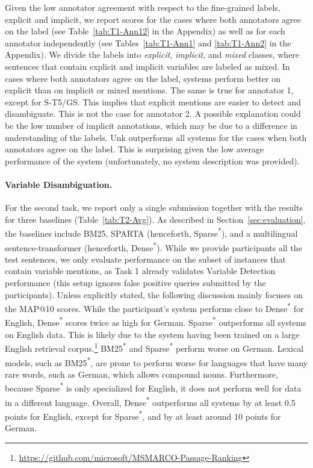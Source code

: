 \documentclass[11pt]{article}
\begin{document}
Given the low annotator agreement with respect to the fine-grained labels, explicit and implicit, we report scores for the cases where both annotators agree on the label (see Table~\ref{tab:T1-Ann12} in the Appendix) as well as for each annotator independently (see Tables~\ref{tab:T1-Ann1} and \ref{tab:T1-Ann2} in the Appendix).
We divide the labels into \textit{explicit}, \textit{implicit}, and \textit{mixed} classes, where sentences that contain explicit and implicit variables are labeled as mixed.
In cases where both annotators agree on the label, systems perform better on explicit than on implicit or mixed mentions.
The same is true for annotator 1, except for S-T5/GS.
This implies that explicit mentions are easier to detect and disambiguate.
This is not the case for annotator 2.
A possible explanation could be the low number of implicit annotations, which may be due to a difference in understanding of the labels.
Unk outperforms all systems for the cases when both annotators agree on the label.
This is surprising given the low average performance of the system (unfortunately, no system description was provided).

\paragraph{Variable Disambiguation.}
For the second task, we report only a single submission together with the results for three baselines (Table~\ref{tab:T2-Avg}).
As described in Section~\ref{sec:evaluation}, the baselines include BM25, SPARTA (henceforth, Sparse\textsuperscript{*}), and a multilingual sentence-transformer (henceforth, Dense\textsuperscript{*}).
While we provide participants all the test sentences, we only evaluate performance on the subset of instances that contain variable mentions, as Task 1 already validates Variable Detection performance (this setup ignores false positive queries submitted by the participants).
Unless explicitly stated, the following discussion mainly focuses on the MAP@10 scores.
While the participant's system performs close to Dense\textsuperscript{*} for English, Dense\textsuperscript{*} scores twice as high for German.
Sparse\textsuperscript{*} outperforms all systems on English data.
This is likely due to the system having been trained on a large English retrieval corpus.\footnote{\url{https://github.com/microsoft/MSMARCO-Passage-Ranking}}
BM25\textsuperscript{*} and Sparse\textsuperscript{*} perform worse on German.
Lexical models, such as BM25\textsuperscript{*}, are prone to perform worse for languages that have many rare words, such as German, which allows compound nouns.
Furthermore, because Sparse\textsuperscript{*} is only specialized for English, it does not perform well for data in a different language.
Overall, Dense\textsuperscript{*} outperforms all systems by at least 0.5 points for English, except for Sparse\textsuperscript{*}, and by at least around 10 points for German.
\end{document}
